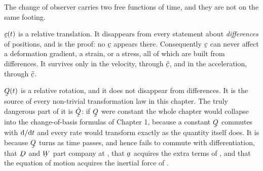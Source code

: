 \begin{remark}\label{rem:ch7twofreedoms}
The change of observer carries two free functions of time, and they are
not on the same footing.

$\bc(t)$ is a relative translation. It disappears from every statement
about \emph{differences} of positions, and  is the proof: no
$\bc$ appears there. Consequently $\bc$ can never affect a deformation
gradient, a strain, or a stress, all of which are built from differences.
It survives only in the velocity, through $\dot\bc$, and in the
acceleration, through $\ddot\bc$.

$\bQ(t)$ is a relative rotation, and it does not disappear from
differences. It is the source of every non-trivial transformation law in
this chapter. The truly dangerous part of it is $\dot\bQ$: if $\bQ$ were
constant the whole chapter would collapse into the change-of-basis
formulas of Chapter 1, because a constant $\bQ$ commutes with $\mathrm{d}/\mathrm{d} t$
and every rate would transform exactly as the quantity itself does. It is
because $\bQ$ turns as time passes, and hence fails to commute with
differentiation, that $\bD$ and $\bW$ part company at , that
$\ba$ acquires the extra terms of , and that the equation of
motion acquires the inertial force of .
\end{remark}

